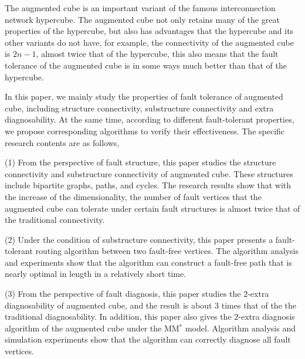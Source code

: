 \begin{englishabstract}
The augmented cube is an important variant of the famous interconnection network hypercube. The augmented cube not only retains many of the great properties of the hypercube, but also has advantages that the hypercube and its other variants do not have, for example, the connectivity of the augmented cube is $2n-1$, almost twice that of the hypercube, this also means that the fault tolerance of the augmented cube is in some ways much better than that of the hypercube.

In this paper, we mainly study the properties of fault tolerance of augmented cube, including structure connectivity, substructure connectivity and extra diagnosability. At the same time, according to different fault-tolerant properties, we propose corresponding algorithms to verify their effectiveness. The specific research contents are as follows,

(1) From the perspective of fault structure, this paper studies the structure connectivity and substructure connectivity of augmented cube. These structures include bipartite graphs, paths, and cycles. The research results show that with the increase of the dimensionality, the number of fault vertices that the augmented cube can tolerate under certain fault structures is almost twice that of the traditional connectivity.

(2) Under the condition of substructure connectivity, this paper presents a fault-tolerant routing algorithm between two fault-free vertices. The algorithm analysis and experiments show that the algorithm can construct a fault-free path that is nearly optimal in length in a relatively short time.

(3) From the perspective of fault diagnosis, this paper studies the $2$-extra diagnosability of augmented cube, and the result is about 3 times that of the the traditional diagnosability. In addition, this paper also gives the $2$-extra diagnosis algorithm of the augmented cube under the MM$^*$ model. Algorithm analysis and simulation experiments show that the algorithm can correctly diagnose all fault vertices.



\end{englishabstract}
